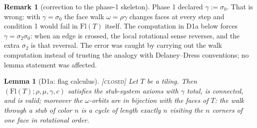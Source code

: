 \documentclass[11pt]{article}
\newtheorem{lemma}[theorem]{Lemma}
\theoremstyle{definition}
\newtheorem{remark}[theorem]{Remark}
\newcommand{\CLOSED}{\textnormal{\textsc{[closed]}}}
\newcommand{\Flags}{\mathrm{Fl}}
\begin{document}
\begin{remark}[correction to the phase-1 skeleton]\label{rem:gammafix}
Phase 1 declared $\gamma := \sigma_0$. That is wrong: with $\gamma = \sigma_0$ the face
walk $\omega = \rho\gamma$ changes faces at every step and condition 1 would fail in
$\Flags(T)$ itself. The computation in D1a below forces $\gamma = \sigma_2\sigma_0$: when
an edge is crossed, the local rotational sense reverses, and the extra $\sigma_2$ is that
reversal. The error was caught by carrying out the walk computation instead of trusting
the analogy with Delaney--Dress conventions; no lemma statement was affected.
\end{remark}

\begin{lemma}[D1a: flag calculus]\label{lem:D1a} \CLOSED\;
Let $T$ be a tiling. Then $(\Flags(T); \rho, \mu, \gamma, c)$ satisfies the stub-system
axioms with $\gamma$ total, is connected, and is valid; moreover the $\omega$-orbits are
in bijection with the faces of $T$: the walk through a stub of color $n$ is a cycle of
length exactly $n$ visiting the $n$ corners of one face in rotational order.
\end{lemma}
\end{document}
